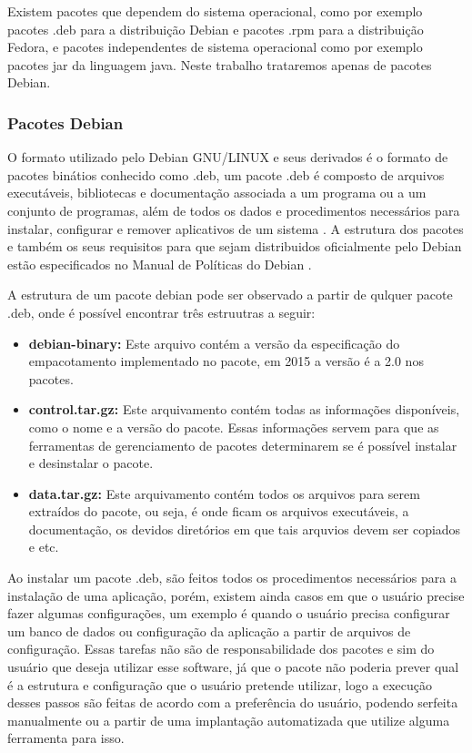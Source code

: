 Existem pacotes que dependem do sistema operacional, como por exemplo pacotes .deb
para a distribuição Debian e pacotes .rpm para a distribuição Fedora, e
pacotes independentes de sistema operacional como por exemplo pacotes jar da
linguagem java. Neste trabalho trataremos apenas de pacotes Debian.

\subsubsection{Pacotes Debian}

O formato utilizado pelo Debian GNU/LINUX e seus derivados é o formato de pacotes
binátios conhecido como .deb, um pacote .deb é composto de arquivos executáveis,
bibliotecas e documentação associada a um programa ou a um conjunto de programas,
além de todos os dados e procedimentos necessários para instalar, configurar e remover
aplicativos de um sistema \cite{araujo2011apprecommender}. A estrutura dos pacotes
e também os seus requisitos para que sejam distribuidos oficialmente pelo Debian
estão especificados no Manual de Políticas do Debian \cite{debian}.

A estrutura de um pacote debian pode ser observado a partir de qulquer pacote
.deb, onde é possível encontrar três estruutras a seguir:

\begin{itemize}
  \item \textbf{debian-binary:} Este arquivo contém a versão da especificação
  do empacotamento implementado no pacote, em 2015 a versão é a 2.0 nos pacotes.
  \item \textbf{control.tar.gz:} Este arquivamento contém todas as informações
   disponíveis, como o nome e a versão do pacote. Essas informações servem para
   que as ferramentas de gerenciamento de pacotes determinarem se é possível
   instalar e desinstalar o pacote.
   \item \textbf{data.tar.gz:} Este arquivamento contém todos os arquivos para
   serem extraídos do pacote, ou seja, é onde ficam os arquivos executáveis, a documentação,
   os devidos diretórios em que tais arquvios devem ser copiados e etc.
\end{itemize}

Ao instalar um pacote .deb, são feitos todos os procedimentos necessários para a instalação
de uma aplicação, porém, existem ainda casos em que o usuário precise fazer algumas
configurações, um exemplo é quando o usuário precisa configurar um banco de dados
ou configuração da aplicação a partir de arquivos de configuração. Essas tarefas
não são de responsabilidade dos pacotes e sim do usuário que deseja utilizar esse
software, já que o pacote não poderia prever qual é a estrutura e configuração
que o usuário pretende utilizar, logo a execução desses passos são feitas de
acordo com a preferência do usuário, podendo serfeita manualmente ou a partir
de uma implantação automatizada que utilize alguma ferramenta para isso.

